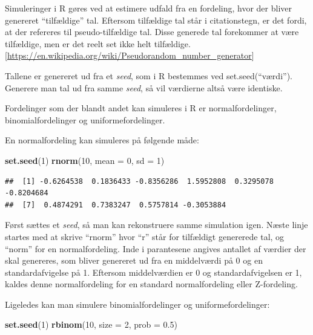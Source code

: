 \documentclass[]{book}
\newenvironment{Shaded}{\begin{snugshade}}{\end{snugshade}}
\newcommand{\DataTypeTok}[1]{\textcolor[rgb]{0.13,0.29,0.53}{#1}}
\newcommand{\DecValTok}[1]{\textcolor[rgb]{0.00,0.00,0.81}{#1}}
\newcommand{\FloatTok}[1]{\textcolor[rgb]{0.00,0.00,0.81}{#1}}
\newcommand{\KeywordTok}[1]{\textcolor[rgb]{0.13,0.29,0.53}{\textbf{#1}}}
\newcommand{\NormalTok}[1]{#1}
\theoremstyle{definition}
\theoremstyle{definition}
\theoremstyle{definition}
\theoremstyle{remark}
\begin{document}
Simuleringer i R gøres ved at estimere udfald fra en fordeling, hvor der bliver genereret ``tilfældige'' tal. Eftersom tilfældige tal står i citationstegn, er det fordi, at der refereres til pseudo-tilfældige tal.
Disse generede tal forekommer at være tilfældige, men er det reelt set ikke helt tilfældige. {[}\url{https://en.wikipedia.org/wiki/Pseudorandom_number_generator}{]}

Tallene er genereret ud fra et \emph{seed}, som i R bestemmes ved set.seed(``værdi''). Generere man tal ud fra samme \emph{seed}, så vil værdierne altså være identiske.

Fordelinger som der blandt andet kan simuleres i R er normalfordelinger, binomialfordelinger og uniformefordelinger.

En normalfordeling kan simuleres på følgende måde:

\begin{Shaded}
\begin{Highlighting}[]
\KeywordTok{set.seed}\NormalTok{(}\DecValTok{1}\NormalTok{)}
\KeywordTok{rnorm}\NormalTok{(}\DecValTok{10}\NormalTok{, }\DataTypeTok{mean =} \DecValTok{0}\NormalTok{, }\DataTypeTok{sd =} \DecValTok{1}\NormalTok{)}
\end{Highlighting}
\end{Shaded}

\begin{verbatim}
##  [1] -0.6264538  0.1836433 -0.8356286  1.5952808  0.3295078 -0.8204684
##  [7]  0.4874291  0.7383247  0.5757814 -0.3053884
\end{verbatim}

Først sættes et \emph{seed}, så man kan rekonstruere samme simulation igen. Næste linje startes med at skrive ``rnorm'' hvor ``r'' står for tilfældigt genererede tal, og ``norm'' for en normalfordeling. Inde i parantesene angives antallet af værdier der skal genereres, som bliver genereret ud fra en middelværdi på 0 og en standardafvigelse på 1. Eftersom middelværdien er 0 og standardafvigelsen er 1, kaldes denne normalfordeling for en standard normalfordeling eller Z-fordeling.

Ligeledes kan man simulere binomialfordelinger og uniformefordelinger:

\begin{Shaded}
\begin{Highlighting}[]
\KeywordTok{set.seed}\NormalTok{(}\DecValTok{1}\NormalTok{)}
\KeywordTok{rbinom}\NormalTok{(}\DecValTok{10}\NormalTok{, }\DataTypeTok{size =} \DecValTok{2}\NormalTok{, }\DataTypeTok{prob =} \FloatTok{0.5}\NormalTok{)}
\end{Highlighting}
\end{Shaded}
\end{document}
